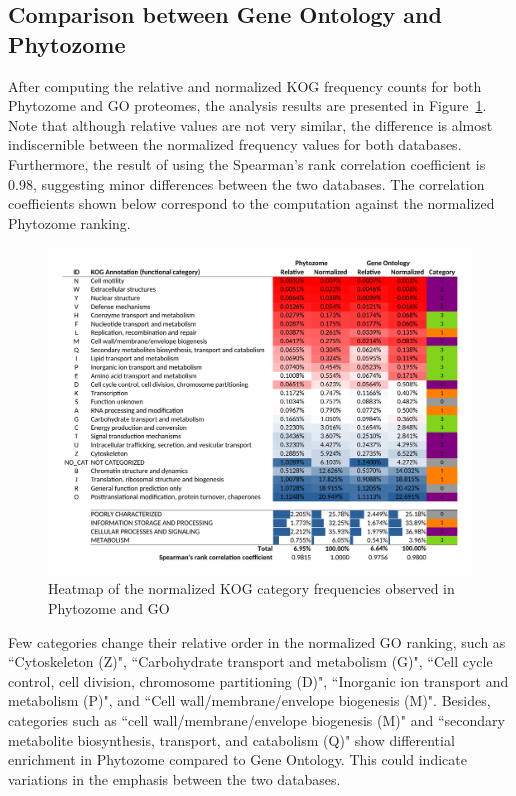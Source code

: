 \subsection{Comparison between Gene Ontology and Phytozome}
\label{sec:results.phytozome-go}

After computing the relative and normalized KOG frequency 
counts for both Phytozome and GO proteomes, the analysis 
results are presented in Figure~\ref{fig:GO}. Note that 
although relative values are not very similar, 
the difference is almost indiscernible between the normalized 
frequency values for both databases. Furthermore, the result 
of using the Spearman's rank correlation coefficient is 0.98, 
suggesting minor differences between the two databases. The 
correlation coefficients shown below correspond to the 
computation against the normalized Phytozome ranking.

\begin{figure}[htp!]
\centering
\includegraphics[width=\textwidth]{figures/Heatmap_GO}
\caption{Heatmap of the normalized KOG category frequencies 
observed in Phytozome and GO}
\label{fig:GO}
\end{figure}

Few categories change their relative order in the normalized 
GO ranking, such as ``Cytoskeleton (Z)", ``Carbohydrate 
transport and metabolism (G)", ``Cell cycle control, cell 
division, chromosome partitioning (D)", ``Inorganic ion 
transport and metabolism (P)", and 
``Cell wall/membrane/envelope biogenesis (M)". Besides, 
categories such as ``cell wall/membrane/envelope 
biogenesis (M)" and ``secondary metabolite biosynthesis, 
transport, and catabolism (Q)" show differential 
enrichment in Phytozome compared to Gene Ontology. 
This could indicate variations in the emphasis between 
the two databases.

